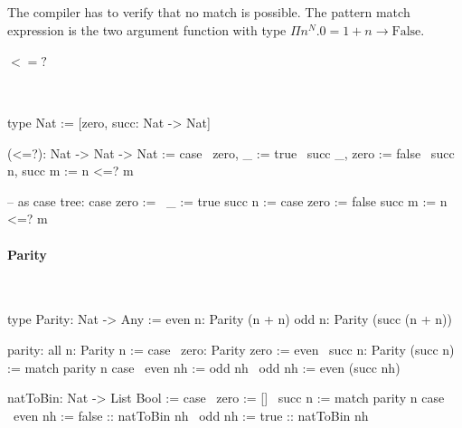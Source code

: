 The compiler has to verify that no match is possible. The pattern match
expression is the two argument function with type $\Pi n^N. 0 = 1 + n \to
\text{False}$.



\paragraph{$<=?$}
\ \begin{alba}
    type Nat := [zero, succ: Nat -> Nat]

    (<=?): Nat -> Nat -> Nat := case
        \ zero,   _      :=  true
        \ succ _, zero   :=  false
        \ succ n, succ m :=  n <=? m

    -- as case tree:
    case
        zero           :=   \ _ := true
        succ n :=
            case
                zero   :=   false
                succ m :=   n <=? m
\end{alba}


\paragraph{Parity}
\ \begin{alba}
    type Parity: Nat -> Any :=
        even n: Parity (n + n)
        odd  n: Parity (succ (n + n))

    parity: all n: Parity n := case
        \ zero: Parity zero :=
            even
        \ succ n: Parity (succ n) :=
            match parity n case
                \ even nh :=
                    odd nh
                \ odd nh :=
                    even (succ nh)

    natToBin: Nat -> List Bool := case
        \ zero :=
            []
        \ succ n :=
            match parity n case
                \ even nh :=
                    false :: natToBin nh
                \ odd nh :=
                    true :: natToBin nh
\end{alba}
